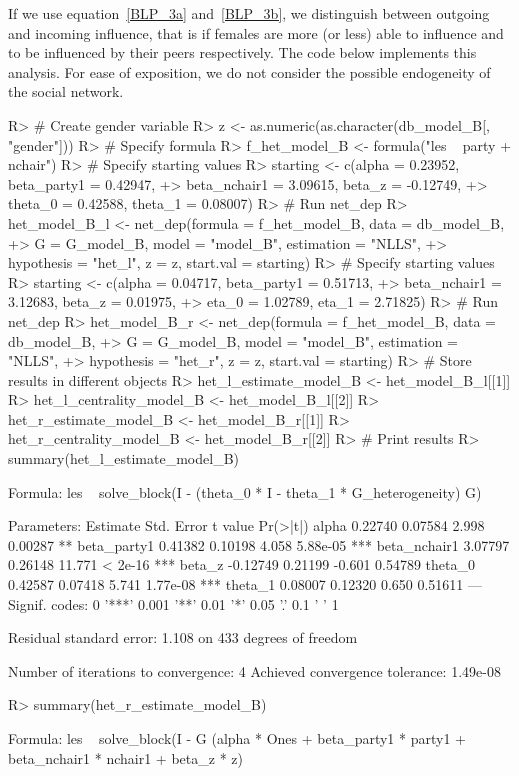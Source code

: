 \documentclass[nojss]{jss}
\begin{document}
If we use equation~\ref{BLP_3a} and~\ref{BLP_3b}, we distinguish between outgoing and incoming influence, that is if females are more (or less) able to influence and to be influenced by their peers respectively. The code below implements this analysis. For ease of exposition, we do not consider the possible endogeneity of the social network.
\begin{CodeChunk}
\begin{CodeInput}
R> # Create gender variable
R> z <- as.numeric(as.character(db_model_B[, "gender"]))
R> # Specify formula
R> f_het_model_B <- formula("les ~ party + nchair")
R> # Specify starting values
R> starting <- c(alpha = 0.23952, beta_party1 = 0.42947,
+> beta_nchair1 = 3.09615, beta_z = -0.12749,
+> theta_0 = 0.42588, theta_1 = 0.08007)
R> # Run net_dep
R> het_model_B_l <- net_dep(formula = f_het_model_B, data = db_model_B,
+> G = G_model_B, model = "model_B", estimation = "NLLS",
+> hypothesis = "het_l", z = z, start.val = starting)
R> # Specify starting values
R> starting <- c(alpha = 0.04717, beta_party1 = 0.51713,
+> beta_nchair1 = 3.12683, beta_z = 0.01975,
+> eta_0 = 1.02789, eta_1 = 2.71825)
R> # Run net_dep
R> het_model_B_r <- net_dep(formula = f_het_model_B, data = db_model_B,
+> G = G_model_B, model = "model_B", estimation = "NLLS",
+> hypothesis = "het_r", z = z, start.val = starting)
R> # Store results in different objects
R> het_l_estimate_model_B <- het_model_B_l[[1]]
R> het_l_centrality_model_B <- het_model_B_l[[2]]
R> het_r_estimate_model_B <- het_model_B_r[[1]]
R> het_r_centrality_model_B <- het_model_B_r[[2]]
R> # Print results
R> summary(het_l_estimate_model_B)
\end{CodeInput}
\begin{CodeOutput}
Formula: les ~ solve_block(I - (theta_0 * I - theta_1 * G_heterogeneity) %
G) %

Parameters:
Estimate Std. Error t value Pr(>|t|)    
alpha         0.22740    0.07584   2.998  0.00287 ** 
beta_party1   0.41382    0.10198   4.058 5.88e-05 ***
beta_nchair1  3.07797    0.26148  11.771  < 2e-16 ***
beta_z       -0.12749    0.21199  -0.601  0.54789    
theta_0       0.42587    0.07418   5.741 1.77e-08 ***
theta_1       0.08007    0.12320   0.650  0.51611    
---
Signif. codes:  0 '***' 0.001 '**' 0.01 '*' 0.05 '.' 0.1 ' ' 1

Residual standard error: 1.108 on 433 degrees of freedom

Number of iterations to convergence: 4 
Achieved convergence tolerance: 1.49e-08
\end{CodeOutput}
\begin{CodeInput}
R> summary(het_r_estimate_model_B)
\end{CodeInput}
\begin{CodeOutput}
Formula: les ~ solve_block(I - G %
(alpha * Ones + beta_party1 * party1 + beta_nchair1 * nchair1 + beta_z * z)


\end{CodeOutput}
\end{CodeChunk}
\end{document}

